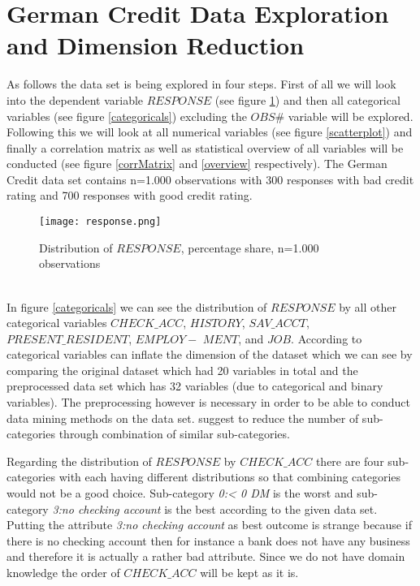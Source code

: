 \newpage
\section{German Credit Data Exploration and Dimension Reduction} \label{appendix1}
As follows the data set is being explored in four steps. First of all we will look into the dependent variable $RESPONSE$ (see figure \ref{response}) and then all categorical variables (see figure \ref{categoricals}) excluding the $ OBS\#$ variable will be explored. Following this we will look at all numerical variables (see figure \ref{scatterplot}) and finally a correlation matrix as well as statistical overview of all variables will be conducted (see figure \ref{corrMatrix} and \ref{overview} respectively). The German Credit data set contains n=1.000 observations with 300 responses with bad credit rating and 700 responses with good credit rating.\\ %
\begin{figure}[htbp]
	\centering
	\texttt{[image: response.png]}
	\caption{Distribution of $RESPONSE$, percentage share, n=1.000 observations}
	\label{response}
\end{figure}\\
In figure \ref{categoricals} we can see the distribution of $RESPONSE$ by all other categorical variables $CHECK\_ACC$, $HISTORY$, $SAV\_ACCT$, $PRESENT\_RESIDENT$, $EMPLOY-$ $MENT$, and $JOB$. According to \cite[pp.76-77]{shmueli} categorical variables can inflate the dimension of the dataset which we can see by comparing the original dataset which had 20 variables in total and the preprocessed data set which has 32 variables (due to categorical and binary variables). The preprocessing however is necessary in order to be able to conduct data mining methods on the data set. \cite[pp.76-77]{shmueli} suggest to reduce the number of sub-categories through combination of similar sub-categories. 

Regarding the distribution of $RESPONSE$ by $CHECK\_ACC$ there are four sub-categories with each having different distributions so that combining categories would not be a good choice. Sub-category \textit{0:< 0 DM} is the worst and sub-category \textit{3:no checking account} is the best according to the given data set. Putting the attribute \textit{3:no checking account} as best outcome is strange because if there is no checking account then for instance a bank does not have any business and therefore it is actually a rather bad attribute. Since we do not have domain knowledge the order of $CHECK\_ACC$ will be kept as it is.

